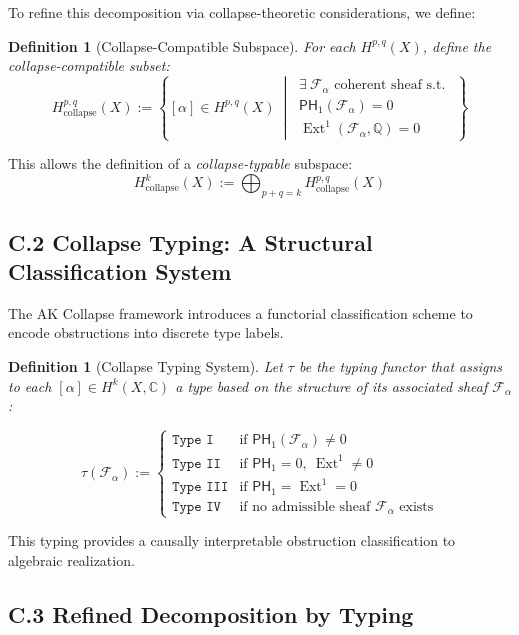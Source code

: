 \documentclass[11pt]{article}
\newtheorem{definition}[theorem]{Definition}
\DeclareMathOperator{\Ext}{Ext}
\begin{document}
To refine this decomposition via collapse-theoretic considerations, we define:

\begin{definition}[Collapse-Compatible Subspace]
For each $H^{p,q}(X)$, define the collapse-compatible subset:
\[
H^{p,q}_{\text{collapse}}(X) := \left\{ [\alpha] \in H^{p,q}(X) \ \middle| \ 
\begin{array}{l}
\exists \ \mathcal{F}_\alpha \text{ coherent sheaf s.t. } \\
\mathsf{PH}_1(\mathcal{F}_\alpha) = 0 \\
\Ext^1(\mathcal{F}_\alpha, \mathbb{Q}) = 0
\end{array}
\right\}
\]
\end{definition}

This allows the definition of a \emph{collapse-typable} subspace:
\[
H^k_{\text{collapse}}(X) := \bigoplus_{p+q=k} H^{p,q}_{\text{collapse}}(X)
\]

\subsection*{C.2 Collapse Typing: A Structural Classification System}

The AK Collapse framework introduces a functorial classification scheme to encode obstructions into discrete type labels.

\begin{definition}[Collapse Typing System]
Let $\tau$ be the typing functor that assigns to each $[\alpha] \in H^k(X, \mathbb{C})$ a type based on the structure of its associated sheaf $\mathcal{F}_\alpha$:

\[
\tau(\mathcal{F}_\alpha) :=
\begin{cases}
\texttt{Type I} & \text{if } \mathsf{PH}_1(\mathcal{F}_\alpha) \ne 0 \\
\texttt{Type II} & \text{if } \mathsf{PH}_1 = 0,\ \Ext^1 \ne 0 \\
\texttt{Type III} & \text{if } \mathsf{PH}_1 = \Ext^1 = 0 \\
\texttt{Type IV} & \text{if no admissible sheaf } \mathcal{F}_\alpha \text{ exists}
\end{cases}
\]
\end{definition}

This typing provides a causally interpretable obstruction classification to algebraic realization.

\subsection*{C.3 Refined Decomposition by Typing}
\end{document}
